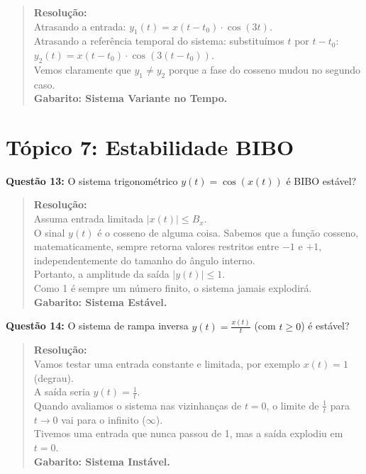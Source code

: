 \begin{quote}
\textbf{Resolução:}\\
Atrasando a entrada: \(y_1(t) = x(t-t_0) \cdot \cos(3t)\).\\
Atrasando a referência temporal do sistema: substituímos \(t\) por \(t-t_0\):\\
\(y_2(t) = x(t-t_0) \cdot \cos(3(t-t_0))\).\\
Vemos claramente que \(y_1 \neq y_2\) porque a fase do cosseno mudou no segundo caso.\\
\textbf{Gabarito: Sistema Variante no Tempo.}
\end{quote}

\section{Tópico 7: Estabilidade BIBO}\label{tuxf3pico-7-estabilidade-bibo}

\textbf{Questão 13:} O sistema trigonométrico \(y(t) = \cos(x(t))\) é BIBO estável?

\begin{quote}
\textbf{Resolução:}\\
Assuma entrada limitada \(|x(t)| \le B_x\).\\
O sinal \(y(t)\) é o cosseno de alguma coisa. Sabemos que a função cosseno, matematicamente, sempre retorna valores restritos entre \(-1\) e \(+1\), independentemente do tamanho do ângulo interno.\\
Portanto, a amplitude da saída \(|y(t)| \le 1\).\\
Como 1 é sempre um número finito, o sistema jamais explodirá.\\
\textbf{Gabarito: Sistema Estável.}
\end{quote}

\textbf{Questão 14:} O sistema de rampa inversa \(y(t) = \frac{x(t)}{t}\) (com \(t \ge 0\)) é estável?

\begin{quote}
\textbf{Resolução:}\\
Vamos testar uma entrada constante e limitada, por exemplo \(x(t) = 1\) (degrau).\\
A saída seria \(y(t) = \frac{1}{t}\).\\
Quando avaliamos o sistema nas vizinhanças de \(t=0\), o limite de \(\frac{1}{t}\) para \(t \to 0\) vai para o infinito (\(\infty\)).\\
Tivemos uma entrada que nunca passou de 1, mas a saída explodiu em \(t=0\).\\
\textbf{Gabarito: Sistema Instável.}
\end{quote}

